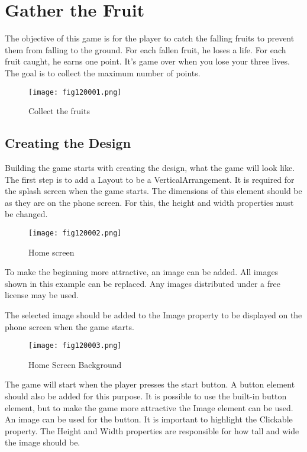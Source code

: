 \chapter{Gather the Fruit}

The objective of this game is for the player to catch the falling fruits to prevent them from falling to the ground. For each fallen fruit, he loses a life. For each fruit caught, he earns one point. It's game over when you lose your three lives. The goal is to collect the maximum number of points.

\begin{figure}[H]
   \centering
   \texttt{[image: fig120001.png]}
   \caption{Collect the fruits}
\label{fig120001}
\end{figure}

\section{Creating the Design}
Building the game starts with creating the design, what the game will look like. The first step is to add a Layout to be a VerticalArrangement. It is required for the splash screen when the game starts. The dimensions of this element should be as they are on the phone screen. For this, the height and width properties must be changed.

\begin{figure}[H]
   \centering
   \texttt{[image: fig120002.png]}
   \caption{Home screen}
\label{fig120002}
\end{figure}

To make the beginning more attractive, an image can be added. All images shown in this example can be replaced. Any images distributed under a free license may be used.

The selected image should be added to the Image property to be displayed on the phone screen when the game starts.

\begin{figure}[H]
   \centering
   \texttt{[image: fig120003.png]}
   \caption{Home Screen Background}
\label{fig120003}
\end{figure}

The game will start when the player presses the start button. A button element should also be added for this purpose. It is possible to use the built-in button element, but to make the game more attractive the Image element can be used. An image can be used for the button. It is important to highlight the Clickable property. The Height and Width properties are responsible for how tall and wide the image should be.


